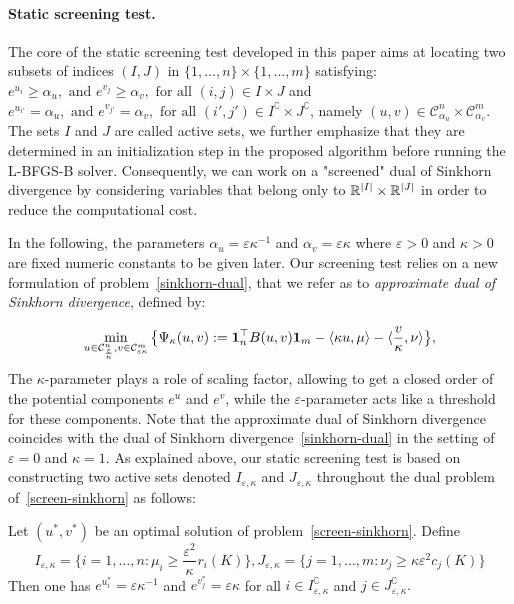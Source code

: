 \paragraph{Static screening test.} The core of the static screening test developed in this paper aims at locating two subsets of indices $(I, J)$ in $\{1, \ldots, n\}\times\{1, \ldots, m\}$ satisfying: $e^{u_i}\geq \alpha_u, \text{ and } e^{v_j}\geq \alpha_v, \text{ for all } (i,j) \in I \times J$ and 
$e^{u_{i'}} = \alpha_u, \text{ and } e^{v_{j'}} = \alpha_v, \text{ for all } (i',j') \in I^\complement \times J^\complement$, namely $(u,v) \in \mathcal{C}^n_{\alpha_u}\times \mathcal{C}^m_{\alpha_v}$.
The sets $I$ and $J$ are called active sets, we further emphasize that they are determined in an initialization step in the proposed algorithm before running the L-BFGS-B solver.
Consequently, we can work on a "screened" dual of Sinkhorn divergence by considering variables that belong only to ${\mathbb{R}}^{|I|} \times {\mathbb{R}}^{|J|}$ in order to reduce the computational cost.

In the following, the parameters $\alpha_u = \varepsilon \kappa^{-1}$ and $\alpha_v = \varepsilon \kappa$ where $\varepsilon > 0$ and $\kappa > 0$ are fixed numeric constants to be given later. 
Our screening test relies on a new formulation of problem~\eqref{sinkhorn-dual}, that we refer as to \emph{approximate dual of Sinkhorn divergence}, defined by:

\begin{equation} 
\label{screen-sinkhorn}
\min_{u \in \mathcal{C}^n_{\frac \varepsilon \kappa}, v\in \mathcal{C}^m_{\varepsilon\kappa}} \big\{\Psi_{\kappa}(u,v):= \mathbf{1}_n^\top B(u,v)\mathbf{1}_m - \langle \kappa u, \mu \rangle - \langle \frac v\kappa, \nu \rangle \big\},
\end{equation}
The $\kappa$-parameter plays a role of scaling factor, allowing to get a closed order of the potential components $e^u$ and $e^v$, while the $\varepsilon$-parameter acts like a threshold for these components.
Note that the approximate dual of Sinkhorn divergence coincides with the dual of Sinkhorn divergence~\eqref{sinkhorn-dual} in the setting of $\varepsilon=0$ and $\kappa=1$.
As explained above, our static screening test is based on constructing two {active sets} denoted $I_{\varepsilon, \kappa}$ and $J_{\varepsilon, \kappa}$ throughout the dual problem of~\eqref{screen-sinkhorn} as follows: 

\begin{lemma}
\label{lemma_actives_sets}
Let $(u^{*}, v^{*})$ be an optimal solution of problem~\eqref{screen-sinkhorn}. 
Define
\begin{equation}
\label{I_epsilon_kappa_J_epsilon_kappa}
I_{\varepsilon,\kappa} = \big\{i=1, \ldots, n: \mu_i \geq \frac {\varepsilon^2} \kappa^{} r_i(K)\big\}, J_{\varepsilon,\kappa} = \big\{j=1, \ldots, m: \nu_j \geq \kappa{\varepsilon^2}{} c_j(K)\big\}
\end{equation}
Then one has $e^{u^{*}_i} = \varepsilon\kappa^{-1}$ and $e^{v^{*}_j} = \varepsilon\kappa$ for all $i \in I^\complement_{\varepsilon,\kappa} $ and $j\in J^\complement_{\varepsilon,\kappa} .$
\end{lemma}

